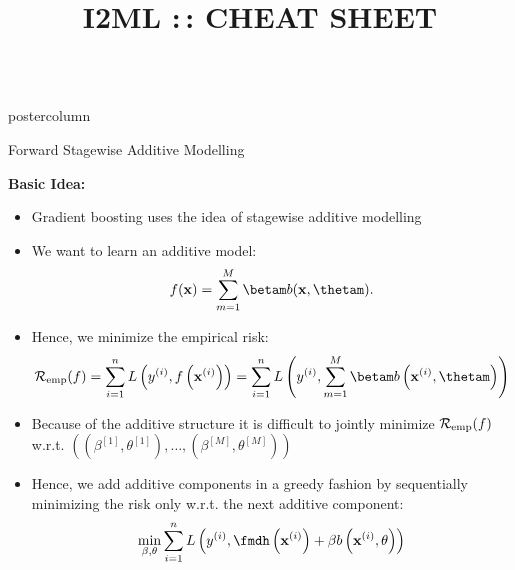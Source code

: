 \documentclass{beamer}
\title{I2ML :\,: CHEAT SHEET} %
\newlength{\columnheight} %
\begin{document}
\begin{frame}[fragile]{}
\begin{columns}
	\begin{column}{.31\textwidth}
		\begin{beamercolorbox}[center]{postercolumn}
			\begin{minipage}{.98\textwidth}
				\parbox[t][\columnheight]{\textwidth}{
					\begin{myblock}{Forward Stagewise Additive Modelling}
						\begin{codebox}
			        \textbf{Basic Idea:}
						\end{codebox}
						  \begin{itemize}[$\bullet$]
                \setlength{\itemindent}{+.3in}
                \item
                  Gradient boosting uses the idea of stagewise additive modelling
                \item
                  We want to learn an additive model:
                  $$
                  \fx = \sum_{m=1}^M \betam b(\xv, \thetam).
                  $$
                \item
                  Hence, we minimize the empirical risk:
                  $$
                    \riskef = \sum_{i=1}^n L\left(\yi,\fxi \right)
                            = \sum_{i=1}^n L\left(\yi, \sum_{m=1}^M \betam b\left(\xi, \thetam\right)\right)
                  $$
                \item
                  Because of the additive structure it is difficult to jointly minimize $\mathcal{R}_{\text{emp}}(f)$ w.r.t.
                  $\left(\left(\beta^{[1]}, \theta^{[1]}\right), \ldots, \left(\beta^{[M]}, \theta^{[M]}\right)\right)$
                \item
                  Hence, we add additive components in a greedy fashion by sequentially minimizing
                  the risk only w.r.t. the next additive component:
                  $$
                  \min \limits_{\beta, \theta} \sum_{i=1}^n L\left(\yi, \fmdh\left(\xi\right) +
                    \beta b\left(\xi, \theta\right)\right)
                  $$
              \end{itemize}


\end{myblock}}
\end{minipage}
\end{beamercolorbox}
\end{column}
\end{columns}
\end{frame}
\end{document}
